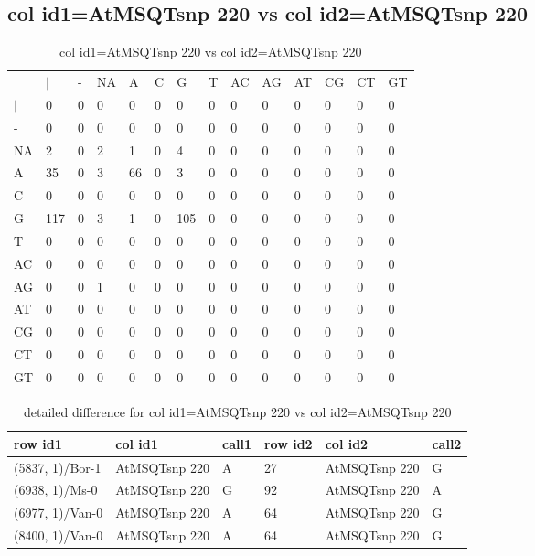 \subsection{col id1=AtMSQTsnp 220 vs col id2=AtMSQTsnp 220}
\begin{center}
\begin{longtable}{|l|l|l|l|l|l|l|l|l|l|l|l|l|l|}
\caption{col id1=AtMSQTsnp 220 vs col id2=AtMSQTsnp 220} \label{table_dm784}\\
\hline
\\
\hline
&$|$&-&NA&A&C&G&T&AC&AG&AT&CG&CT&GT\\
$|$&0&0&0&0&0&0&0&0&0&0&0&0&0\\
-&0&0&0&0&0&0&0&0&0&0&0&0&0\\
NA&2&0&2&1&0&4&0&0&0&0&0&0&0\\
A&35&0&3&66&0&3&0&0&0&0&0&0&0\\
C&0&0&0&0&0&0&0&0&0&0&0&0&0\\
G&117&0&3&1&0&105&0&0&0&0&0&0&0\\
T&0&0&0&0&0&0&0&0&0&0&0&0&0\\
AC&0&0&0&0&0&0&0&0&0&0&0&0&0\\
AG&0&0&1&0&0&0&0&0&0&0&0&0&0\\
AT&0&0&0&0&0&0&0&0&0&0&0&0&0\\
CG&0&0&0&0&0&0&0&0&0&0&0&0&0\\
CT&0&0&0&0&0&0&0&0&0&0&0&0&0\\
GT&0&0&0&0&0&0&0&0&0&0&0&0&0\\
\hline
\end{longtable}
\end{center}

\begin{center}
\begin{longtable}{|l|l|l|l|l|l|}
\caption{detailed difference for col id1=AtMSQTsnp 220 vs col id2=AtMSQTsnp 220} \label{table_dm785}\\
\hline
row id1&col id1&call1&row id2&col id2&call2\\
\hline
(5837, 1)/Bor-1&AtMSQTsnp 220&A&27&AtMSQTsnp 220&G\\
(6938, 1)/Ms-0&AtMSQTsnp 220&G&92&AtMSQTsnp 220&A\\
(6977, 1)/Van-0&AtMSQTsnp 220&A&64&AtMSQTsnp 220&G\\
(8400, 1)/Van-0&AtMSQTsnp 220&A&64&AtMSQTsnp 220&G\\
\hline
\end{longtable}
\end{center}

